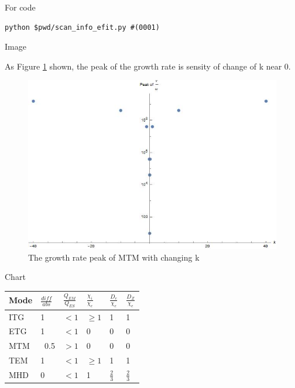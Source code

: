 For code

\begin{verbatim}
python $pwd/scan_info_efit.py #(0001)
\end{verbatim}




Image

As Figure \ref{fig:k_peak} shown, the peak of the growth rate is sensity of change of k near 0.

\begin{figure}[h] \centering
        \includegraphics[width=1\textwidth]{Image/k_peak.jpg}
        \caption{The growth rate peak of MTM with changing k}
        \label{fig:k_peak}
\end{figure}


Chart

\begin{center}
            \begin{tabular}{ | m{5em} | m{2cm}| m{2cm} | m{2cm} |m{2cm} |m{2cm} | } 
                \hline
                Mode & $\frac{diff}{abs}$ & $\frac{Q_{EM}}{Q_{ES}}$ & $\frac{\chi_i}{\chi_e}$ & $\frac{D_e}{\chi_e}$ & $\frac{D_Z}{\chi_e}$\\
                \hline
                ITG & 1 & $<1$ & $\geq1$ & 1 & 1\\
                \hline
                ETG & 1 & $<1$ & 0 & 0 & 0\\
                \hline
                MTM & ~0.5 & $>1$ & 0 & 0 & 0\\
                \hline
                TEM & 1 & $<1$ & $\geq1$ & 1 & 1 \\
                \hline
                MHD & 0 & $<1$ & 1 & $\frac{2}{3}$ & $\frac{2}{3}$\\
                \hline
            \end{tabular}
            \label{ch:finger}
\end{center}




